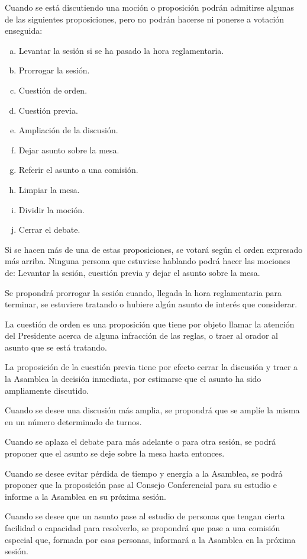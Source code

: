 \article
Cuando se está discutiendo una moción o proposición podrán admitirse algunas de las siguientes proposiciones, pero no podrán hacerse ni ponerse a votación enseguida:
\begin{enumerate}[a)]
    \item Levantar la sesión si se ha pasado la hora reglamentaria.
    \item Prorrogar la sesión.
    \item Cuestión de orden.
    \item Cuestión previa.
    \item Ampliación de la discusión.
    \item Dejar asunto sobre la mesa.
    \item Referir el asunto a una comisión.
    \item Limpiar la mesa.
    \item Dividir la moción.
    \item Cerrar el debate.
\end{enumerate}
Si se hacen más de una de estas proposiciones, se votará según el orden expresado más arriba. Ninguna persona que estuviese hablando podrá hacer las mociones de: Levantar la sesión, cuestión previa y dejar el asunto sobre la mesa.

\article
Se propondrá prorrogar la sesión cuando, llegada la hora reglamentaria para terminar, se estuviere tratando o hubiere algún asunto de interés que considerar.

\article
La cuestión de orden es una proposición que tiene por objeto llamar la atención del Presidente acerca de alguna infracción de las reglas, o traer al orador al asunto que se está tratando.

\article
La proposición de la cuestión previa tiene por efecto cerrar la discusión y traer a la Asamblea la decisión inmediata, por estimarse que el asunto ha sido ampliamente discutido.

\article
Cuando se desee una discusión más amplia, se propondrá que se amplíe la misma en un número determinado de turnos.

\article
Cuando se aplaza el debate para más adelante o para otra sesión, se podrá proponer que el asunto se deje sobre la mesa hasta entonces.

\article
Cuando se desee evitar pérdida de tiempo y energía a la Asamblea, se podrá proponer que la proposición pase al Consejo Conferencial para su estudio e informe a la Asamblea en su próxima sesión.

\article
Cuando se desee que un asunto pase al estudio de personas que tengan cierta facilidad o capacidad para resolverlo, se propondrá que pase a una comisión especial que, formada por esas personas, informará a la Asamblea en la próxima sesión.

